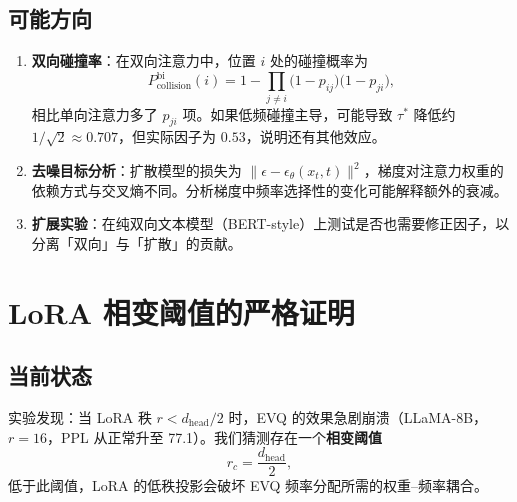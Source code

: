 \documentclass[11pt,a4paper]{article}
\newcommand{\zh}[1]{{\zhfont #1}}
\begin{document}
\subsection*{\zh{可能方向}}
\begin{enumerate}[leftmargin=2em]
  \item \textbf{\zh{双向碰撞率}}\zh{：在双向注意力中，位置} $i$ \zh{处的碰撞概率为}
  \begin{equation}
    P_{\mathrm{collision}}^{\mathrm{bi}}(i) = 1 - \prod_{j \neq i} \bigl(1 - p_{ij}\bigr)\bigl(1-p_{ji}\bigr),
  \end{equation}
  \zh{相比单向注意力多了} $p_{ji}$ \zh{项。如果低频碰撞主导，可能导致} $\tau^*$ \zh{降低约} $1/\sqrt{2} \approx 0.707$\zh{，但实际因子为} $0.53$\zh{，说明还有其他效应。}
  \item \textbf{\zh{去噪目标分析}}\zh{：扩散模型的损失为} $\|\epsilon - \epsilon_\theta(x_t, t)\|^2$\zh{，梯度对注意力权重的依赖方式与交叉熵不同。分析梯度中频率选择性的变化可能解释额外的衰减。}
  \item \textbf{\zh{扩展实验}}\zh{：在纯双向文本模型（}BERT-style\zh{）上测试是否也需要修正因子，以分离「双向」与「扩散」的贡献。}
\end{enumerate}

\vspace{12pt}

\section{LoRA \zh{相变阈值的严格证明}}

\subsection*{\zh{当前状态}}
\zh{实验发现：当} LoRA \zh{秩} $r < d_{\mathrm{head}}/2$ \zh{时，}EVQ \zh{的效果急剧崩溃（}LLaMA-8B\zh{，}$r=16$\zh{，}PPL \zh{从正常升至} 77.1\zh{）。我们猜测存在一个\textbf{相变阈值}}
\begin{equation}
  r_c = \frac{d_{\mathrm{head}}}{2},
  \label{eq:lora-threshold}
\end{equation}
\zh{低于此阈值，}LoRA \zh{的低秩投影会破坏} EVQ \zh{频率分配所需的权重}--\zh{频率耦合。}
\end{document}
